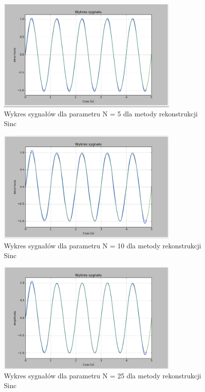 \documentclass{article}
\begin{document}
    \begin{figure}[h!]
        \centering
        \includegraphics[width=0.8\textwidth]{img/1/sinc_5.png}
        \caption{Wykres sygnałów dla parametru N = 5 dla metody rekonstrukcji Sinc}
    \end{figure}
    \FloatBarrier

    \begin{figure}[h!]
        \centering
        \includegraphics[width=0.8\textwidth]{img/1/sinc_10.png}
        \caption{Wykres sygnałów dla parametru N = 10 dla metody rekonstrukcji Sinc}
    \end{figure}
    \FloatBarrier

    \begin{figure}[h!]
        \centering
        \includegraphics[width=0.8\textwidth]{img/1/sinc25.png}
        \caption{Wykres sygnałów dla parametru N = 25 dla metody rekonstrukcji Sinc}
    \end{figure}
    \FloatBarrier
\end{document}
